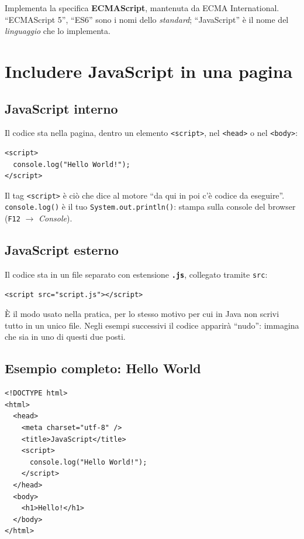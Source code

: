 \documentclass[10pt,a4paper]{article}
\begin{document}
Implementa la specifica \textbf{ECMAScript}, mantenuta da ECMA International. ``ECMAScript 5'', ``ES6'' sono i nomi dello \emph{standard}; ``JavaScript'' è il nome del \emph{linguaggio} che lo implementa.

\section{Includere JavaScript in una pagina}

\subsection{JavaScript interno}

Il codice sta nella pagina, dentro un elemento \texttt{<script>}, nel \texttt{<head>} o nel \texttt{<body>}:

\begin{lstlisting}[style=html]
<script>
  console.log("Hello World!");
</script>
\end{lstlisting}

Il tag \texttt{<script>} è ciò che dice al motore ``da qui in poi c'è codice da eseguire''. \texttt{console.log()} è il tuo \texttt{System.out.println()}: stampa sulla console del browser (\texttt{F12} $\rightarrow$ \emph{Console}).

\subsection{JavaScript esterno}

Il codice sta in un file separato con estensione \textbf{\texttt{.js}}, collegato tramite \texttt{src}:

\begin{lstlisting}[style=html]
<script src="script.js"></script>
\end{lstlisting}

È il modo usato nella pratica, per lo stesso motivo per cui in Java non scrivi tutto in un unico file. Negli esempi successivi il codice apparirà ``nudo'': immagina che sia in uno di questi due posti.

\subsection{Esempio completo: Hello World}

\begin{lstlisting}[style=html]
<!DOCTYPE html>
<html>
  <head>
    <meta charset="utf-8" />
    <title>JavaScript</title>
    <script>
      console.log("Hello World!");
    </script>
  </head>
  <body>
    <h1>Hello!</h1>
  </body>
</html>
\end{lstlisting}
\end{document}
